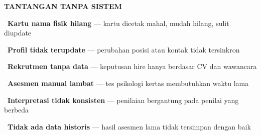 \documentclass[a4paper]{article}
\begin{document}
\noindent
\begin{minipage}[t]{0.485\textwidth}
    \colorbox{RedLight}{%
        \begin{minipage}{\dimexpr\textwidth-2\fboxsep\relax}
            {\fontsize{10}{13}\selectfont\bfseries\color{RedText} TANTANGAN TANPA SISTEM}
        \end{minipage}}\par
    \vspace{4pt}

    {\fontsize{9.5}{13}\selectfont\color{TextDark}%
    \textbullet\ \textbf{Kartu nama fisik hilang} --- kartu dicetak mahal, mudah hilang, sulit diupdate\par\vspace{4pt}%
    \textbullet\ \textbf{Profil tidak terupdate} --- perubahan posisi atau kontak tidak tersinkron\par\vspace{4pt}%
    \textbullet\ \textbf{Rekrutmen tanpa data} --- keputusan hire hanya berdasar CV dan wawancara\par\vspace{4pt}%
    \textbullet\ \textbf{Asesmen manual lambat} --- tes psikologi kertas membutuhkan waktu lama\par\vspace{4pt}%
    \textbullet\ \textbf{Interpretasi tidak konsisten} --- penilaian bergantung pada penilai yang berbeda\par\vspace{4pt}%
    \textbullet\ \textbf{Tidak ada data historis} --- hasil asesmen lama tidak tersimpan dengan baik}%
\end{minipage}%
\hfill%
\end{document}
